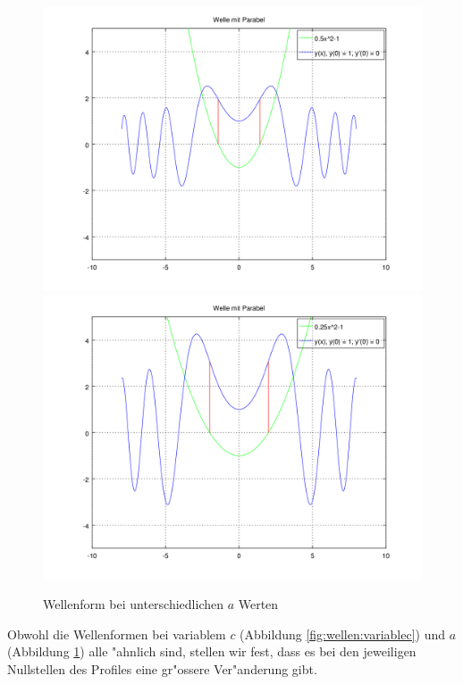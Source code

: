 \begin{figure}
	\includegraphics[scale=0.35]{./wellen/images/vara/ahalbe.png}
	\includegraphics[scale=0.35]{./wellen/images/vara/aviertel.png}
	\caption{Wellenform bei unterschiedlichen $a$ Werten}
	\label{fig:wellen:variablea}
\end{figure}

Obwohl die Wellenformen bei variablem $c$ (Abbildung 
\ref{fig:wellen:variablec}) und $a$ (Abbildung \ref{fig:wellen:variablea}) 
alle "ahnlich sind, stellen wir fest, dass es bei den 
jeweiligen Nullstellen des Profiles eine gr"ossere Ver"anderung gibt.
